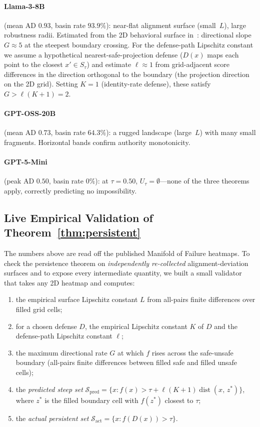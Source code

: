 \documentclass{article}
\newcommand{\dist}{\operatorname{dist}}
\begin{document}
\paragraph{Llama-3-8B} (mean AD $0.93$, basin rate $93.9\%$):
near-flat alignment surface (small~$L$), large robustness radii.
Estimated from the 2D behavioral surface in~\cite{munshi2026manifold}: directional slope $G \approx 5$ at the steepest boundary crossing.
For the defense-path Lipschitz constant we assume a hypothetical
nearest-safe-projection defense ($D(x)$ maps each point to the closest
$x' \in S_\tau$) and estimate $\ell \approx 1$ from grid-adjacent
score differences in the direction orthogonal to the boundary
(the projection direction on the 2D grid). Setting $K = 1$
(identity-rate defense), these satisfy $G > \ell(K+1) = 2$.

\paragraph{GPT-OSS-20B} (mean AD $0.73$, basin rate $64.3\%$): a
rugged landscape (large~$L$) with many small fragments. Horizontal
bands confirm authority monotonicity.

\paragraph{GPT-5-Mini} (peak AD $0.50$, basin rate $0\%$): at
$\tau = 0.50$, $U_\tau = \emptyset$---none of the three theorems
apply, correctly predicting no impossibility.


\subsection{Live Empirical Validation of Theorem~\ref{thm:persistent}}
\label{sec:live-validation}

The numbers above are read off the published Manifold of Failure
heatmaps. To check the persistence theorem on \emph{independently
re-collected} alignment-deviation surfaces and to expose every
intermediate quantity, we built a small validator that takes any 2D
heatmap and computes:

\begin{enumerate}[nosep,leftmargin=*]
  \item the empirical surface Lipschitz constant $L$ from all-pairs
    finite differences over filled grid cells;
  \item for a chosen defense $D$, the empirical Lipschitz constant $K$
    of $D$ and the defense-path Lipschitz constant $\ell$;
  \item the maximum directional rate $G$ at which $f$ rises across the
    safe-unsafe boundary (all-pairs finite differences between filled
    safe and filled unsafe cells);
  \item the \emph{predicted steep set}
    $\mathcal{S}_{\text{pred}} =
    \{x : f(x) > \tau + \ell(K{+}1)\dist(x,\, z^{*})\}$,
    where $z^{*}$ is the filled boundary cell with $f(z^{*})$ closest
    to $\tau$;
  \item the \emph{actual persistent set}
    $\mathcal{S}_{\text{act}} = \{x : f(D(x)) > \tau\}$.
\end{enumerate}
\end{document}
